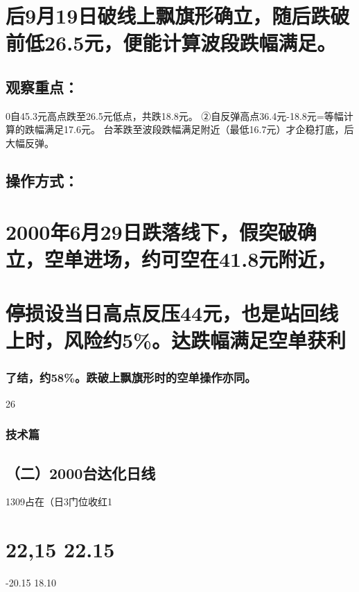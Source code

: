 \documentclass{article}
\begin{document}
\section{后9月19日破线上飘旗形确立，随后跌破前低26.5元，便能计算波段跌幅满足。}

\subsection{观察重点：}

0自45.3元高点跌至26.5元低点，共跌18.8元。 ②自反弹高点36.4元-18.8元=等幅计算的跌幅满足17.6元。 台苯跌至波段跌幅满足附近（最低16.7元）才企稳打底，后大幅反弹。

\subsection{操作方式：}

\section{2000年6月29日跌落线下，假突破确立，空单进场，约可空在41.8元附近，}

\section{停损设当日高点反压44元，也是站回线上时，风险约5\%。达跌幅满足空单获利}

\subsubsection{了结，约58\%。跌破上飘旗形时的空单操作亦同。}

26

\clearpage

\subsubsection{技术篇}

\subsection{（二）2000台达化日线}

1309占在（日3门位收红1

\section{22,15 22.15}

-20.15 18.10
\end{document}
